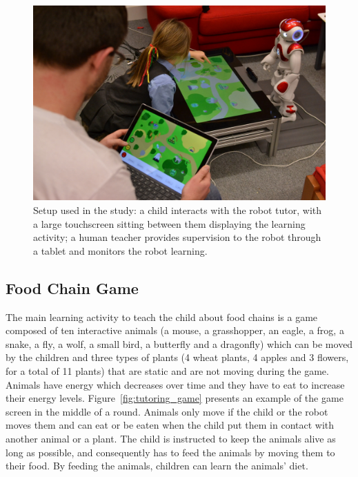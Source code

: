 
\begin{figure}[ht]
	\centering
	\includegraphics[width=1\textwidth]{setup.jpg}
	\caption{Setup used in the study: a child interacts with the robot tutor, with a large touchscreen sitting between them displaying the learning activity; a human teacher provides supervision to the robot through a tablet and monitors the robot learning.}
	\label{fig:tutoring_setup}
\end{figure}

\subsection{Food Chain Game}

The main learning activity to teach the child about food chains is a game composed of ten interactive animals (a mouse, a grasshopper, an eagle, a frog, a snake, a fly, a wolf, a small bird, a butterfly and a dragonfly) which can be moved by the children and three types of plants (4 wheat plants, 4 apples and 3 flowers, for a total of 11 plants) that are static and are not moving during the game. Animals have energy which decreases over time and they have to eat to increase their energy levels. Figure~\ref{fig:tutoring_game} presents an example of the game screen in the middle of a round. Animals only move if the child or the robot moves them and can eat or be eaten when the child put them in contact with another animal or a plant. The child is instructed to keep the animals alive as long as possible, and consequently has to feed the animals by moving them to their food. By feeding the animals, children can learn the animals' diet. 

